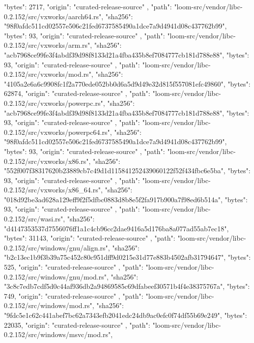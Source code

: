 {{      "bytes": 2717,
      "origin": "curated-release-source"
    },
    {
      "path": "loom-src/vendor/libc-0.2.152/src/vxworks/aarch64.rs",
      "sha256": "98f0afdc511cd02557e506c21fed6737585490a1dce7a9d4941d08c437762b99",
      "bytes": 93,
      "origin": "curated-release-source"
    },
    {
      "path": "loom-src/vendor/libc-0.2.152/src/vxworks/arm.rs",
      "sha256": "acb7968ce99fe3f4abdf39d98f8133d21a4fba435b8ef7084777cb181d788e88",
      "bytes": 93,
      "origin": "curated-release-source"
    },
    {
      "path": "loom-src/vendor/libc-0.2.152/src/vxworks/mod.rs",
      "sha256": "4105a2e6a6c9908fc1f2a770ede052bb0d6a5d9d49e32d815f557081efc49860",
      "bytes": 62874,
      "origin": "curated-release-source"
    },
    {
      "path": "loom-src/vendor/libc-0.2.152/src/vxworks/powerpc.rs",
      "sha256": "acb7968ce99fe3f4abdf39d98f8133d21a4fba435b8ef7084777cb181d788e88",
      "bytes": 93,
      "origin": "curated-release-source"
    },
    {
      "path": "loom-src/vendor/libc-0.2.152/src/vxworks/powerpc64.rs",
      "sha256": "98f0afdc511cd02557e506c21fed6737585490a1dce7a9d4941d08c437762b99",
      "bytes": 93,
      "origin": "curated-release-source"
    },
    {
      "path": "loom-src/vendor/libc-0.2.152/src/vxworks/x86.rs",
      "sha256": "552f007f38317620b23889cb7c49d1d115841252439060122f52f434fbc6e5ba",
      "bytes": 93,
      "origin": "curated-release-source"
    },
    {
      "path": "loom-src/vendor/libc-0.2.152/src/vxworks/x86_64.rs",
      "sha256": "018d92be3ad628a129eff9f2f5dfbc0883d8b8e5f2fa917b900a7f98ed6b514a",
      "bytes": 93,
      "origin": "curated-release-source"
    },
    {
      "path": "loom-src/vendor/libc-0.2.152/src/wasi.rs",
      "sha256": "d4147353537d7556076ff1a1c4cb96cc2dae9416a5d176ba8a077ad55ab7ec18",
      "bytes": 31143,
      "origin": "curated-release-source"
    },
    {
      "path": "loom-src/vendor/libc-0.2.152/src/windows/gnu/align.rs",
      "sha256": "b2c13ec1b9f3b39a75c452c80c951dff9d0215e31d77e883b4502afb31794647",
      "bytes": 525,
      "origin": "curated-release-source"
    },
    {
      "path": "loom-src/vendor/libc-0.2.152/src/windows/gnu/mod.rs",
      "sha256": "3c8c7edb7cdf5d0c44af936db2a94869585c69dfabeef30571b4f4e38375767a",
      "bytes": 749,
      "origin": "curated-release-source"
    },
    {
      "path": "loom-src/vendor/libc-0.2.152/src/windows/mod.rs",
      "sha256": "9fdc5e1c62c441abef7bc62a7343efb2041edc24db9ac0efc0f74df55b69e249",
      "bytes": 22035,
      "origin": "curated-release-source"
    },
    {
      "path": "loom-src/vendor/libc-0.2.152/src/windows/msvc/mod.rs",
}}
